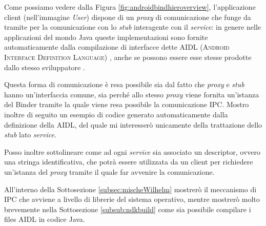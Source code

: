 Come possiamo vedere dalla Figura 
 \vref{fig:androidbindhieroverview}, l'applicazione client (nell'immagine \textit{User})
dispone di un \textit{proxy} di comunicazione che funge da tramite per
la comunicazione con lo \textit{stub} interagente con il \textit{service}: in genere nelle applicazioni del mondo Java
queste implementazioni sono fornite automaticamente dalla compilazione di
interfacce dette AIDL (\textsc{Android Interface Definition Language}) \parencite{libro:carli},
anche se possono essere esse stesse prodotte dallo stesso sviluppatore \parencite{tesi:binder}.

Questa forma di comunicazione è resa possibile sia dal fatto che 
\textit{proxy} e \textit{stub} hanno un'interfaccia  comune, sia perché
allo stesso \textit{proxy} viene fornita un'istanza del Binder tramite la quale viene
resa possibile la comunicazione IPC. Mostro inoltre di seguito un esempio di 
codice generato automaticamente dalla definizione della AIDL, del quale mi
interesserò unicamente della trattazione dello \textit{stub} lato \textit{service}.

Posso inoltre sottolineare come ad ogni \textit{service} sia associato un
descriptor, ovvero una stringa identificativa, che potrà essere utilizzata
da un client per richiedere un'istanza del \textit{proxy} tramite il quale
far avvenire la comunicazione.

\bigskip

All'interno della Sottosezione \vref{subsec:mischeWilhelm} mostrerò il meccanismo
di IPC che avviene a livello di librerie del sistema operativo, mentre mostrerò
molto brevemente nella Sottosezione \vref{subsub:ndkbuild} come sia possibile
compilare i files AIDL in codice Java.

